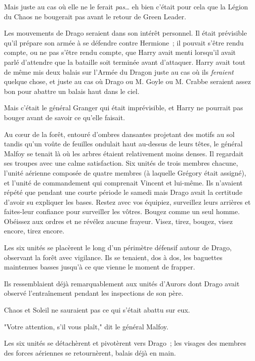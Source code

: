 Mais juste au cas où elle ne le ferait \emph{pas}… eh bien c'était pour cela que la Légion du Chaos ne bougerait pas avant le retour de Green Leader.

Les mouvements de Drago seraient dans son intérêt personnel. Il était prévisible qu'il prépare son armée à se défendre contre Hermione~; il pouvait s'être rendu compte, ou ne pas s'être rendu compte, que Harry avait menti lorsqu'il avait parlé d'attendre que la bataille soit terminée avant d'attaquer. Harry avait tout de même mis deux balais sur l'Armée du Dragon juste au cas où ils \emph{feraient} quelque chose, et juste au cas où Drago ou M. Goyle ou M. Crabbe seraient assez bon pour abattre un balais haut dans le ciel.

Mais c'était le général Granger qui était imprévisible, et Harry ne pourrait pas bouger avant de savoir ce qu'elle faisait.

\later

Au cœur de la forêt, entouré d'ombres dansantes projetant des motifs au sol tandis qu'un voûte de feuilles ondulait haut au-dessus de leurs têtes, le général Malfoy se tenait là où les arbres étaient relativement moins denses. Il regardait ses troupes avec une calme satisfaction. Six unités de trois membres chacune, l'unité aérienne composée de quatre membres (à laquelle Grégory était assigné), et l'unité de commandement qui comprenait Vincent et lui-même. Ils n'avaient répété que pendant une courte période le samedi mais Drago avait la certitude d'avoir su expliquer les bases. Restez avec vos équipiez, surveillez leurs arrières et faites-leur confiance pour surveiller les vôtres. Bougez comme un seul homme. Obéissez aux ordres et ne révélez aucune frayeur. Visez, tirez, bougez, visez encore, tirez encore.

Les six unités se placèrent le long d'un périmètre défensif autour de Drago, observant la forêt avec vigilance. Ils se tenaient, dos à dos, les baguettes maintenues basses jusqu'à ce que vienne le moment de frapper.

Ils ressemblaient déjà remarquablement aux unités d'Aurors dont Drago avait observé l'entraînement pendant les inspections de son père.

Chaos et Soleil ne sauraient pas ce qui s'était abattu sur eux.

"Votre attention, s'il vous plaît," dit le général Malfoy.

Les six unités se détachèrent et pivotèrent vers Drago~; les visages des membres des forces aériennes se retournèrent, balais déjà en main.

